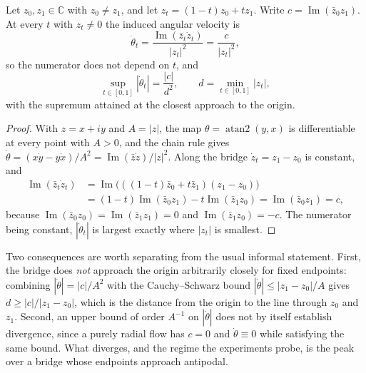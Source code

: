 \begin{proposition}
\label{thm:angular_divergence}
Let $z_0, z_1 \in \mathbb{C}$ with $z_0 \ne z_1$, and let $z_t = (1-t) z_0 + t z_1$. Write $c = \operatorname{Im}(\bar{z}_0 z_1)$. At every $t$ with $z_t \ne 0$ the induced angular velocity is
\begin{equation}
    \dot{\theta}_t = \frac{\operatorname{Im}(\bar{z}_t \dot{z}_t)}{|z_t|^2} = \frac{c}{|z_t|^2},
\end{equation}
so the numerator does not depend on $t$, and
\begin{equation}
    \label{eq:peak_angular}
    \sup_{t \in [0,1]} |\dot{\theta}_t| = \frac{|c|}{d^2}, \qquad d = \min_{t \in [0,1]} |z_t| ,
\end{equation}
with the supremum attained at the closest approach to the origin.
\end{proposition}
\begin{proof}
With $z = x + iy$ and $A = |z|$, the map $\theta = \operatorname{atan2}(y, x)$ is differentiable at every point with $A > 0$, and the chain rule gives $\dot{\theta} = (x\dot{y} - y\dot{x}) / A^2 = \operatorname{Im}(\bar{z}\dot{z}) / |z|^2$. Along the bridge $\dot{z}_t = z_1 - z_0$ is constant, and
\begin{align}
    \operatorname{Im}(\bar{z}_t \dot{z}_t)
    &= \operatorname{Im}\big( ((1-t)\bar{z}_0 + t \bar{z}_1)(z_1 - z_0) \big) \\
    &= (1-t) \operatorname{Im}(\bar{z}_0 z_1) - t \operatorname{Im}(\bar{z}_1 z_0) = \operatorname{Im}(\bar{z}_0 z_1) = c,
\end{align}
because $\operatorname{Im}(\bar{z}_0 z_0) = \operatorname{Im}(\bar{z}_1 z_1) = 0$ and $\operatorname{Im}(\bar{z}_1 z_0) = -c$. The numerator being constant, $|\dot{\theta}_t|$ is largest exactly where $|z_t|$ is smallest.
\end{proof}

Two consequences are worth separating from the usual informal statement. First, the bridge does \emph{not} approach the origin arbitrarily closely for fixed endpoints: combining $|\dot{\theta}| = |c| / A^2$ with the Cauchy--Schwarz bound $|\dot{\theta}| \le |z_1 - z_0| / A$ gives $d \ge |c| / |z_1 - z_0|$, which is the distance from the origin to the line through $z_0$ and $z_1$. Second, an upper bound of order $A^{-1}$ on $|\dot{\theta}|$ does not by itself establish divergence, since a purely radial flow has $c = 0$ and $\dot{\theta} \equiv 0$ while satisfying the same bound. What diverges, and the regime the experiments probe, is the peak over a bridge whose endpoints approach antipodal.

